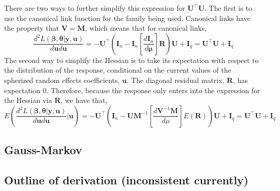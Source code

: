 \documentclass{jss}
\begin{document}
There are two ways to further simplify this expression for $\bm U^\top \bm U$. The
first is to use the canonical link function for the family being
used. Canonical links have the property that $\bm V = \bm M$, which means
that for canonical links,
\begin{equation}
\frac{d^2 L(\bm\beta, \bm\theta | \bm y, \bm u)}{d \bm u d \bm u} = 
-\bm U^\top\left( 
\bm I_n - 
\bm I_n \left[ \frac{d \bm I_n}{d \bm\mu} \right] \bm R
\right) \bm U + \bm I_q = \bm U^\top \bm U + \bm I_q
\end{equation}
The second way to simplify the Hessian is to take its expectation with
respect to the distribution of the response, conditional on the current
values of the spherized random effects coefficients, $\bm u$. The
diagonal residual matrix, $\bm R$, has expectation 0. Therefore,
because the response only enters into the expression for the Hessian
via $\bm R$, we have that,
\begin{equation}
E\left(\frac{d^2 L(\bm\beta, \bm\theta | \bm y, \bm u)}{d \bm u d \bm
    u} | \bm u \right) = 
-\bm U^\top\left( 
\bm I_n - 
\bm U \bm M^{-1}\left[ \frac{d \bm V^{-1}\bm M}{d\mu} \right] E(\bm R)
\right) \bm U + \bm I_q = \bm U^\top \bm U + \bm I_q
\label{eq:betaHessian}
\end{equation}

\subsection{Gauss-Markov}

\subsection{Outline of derivation (inconsistent currently)}
\end{document}
